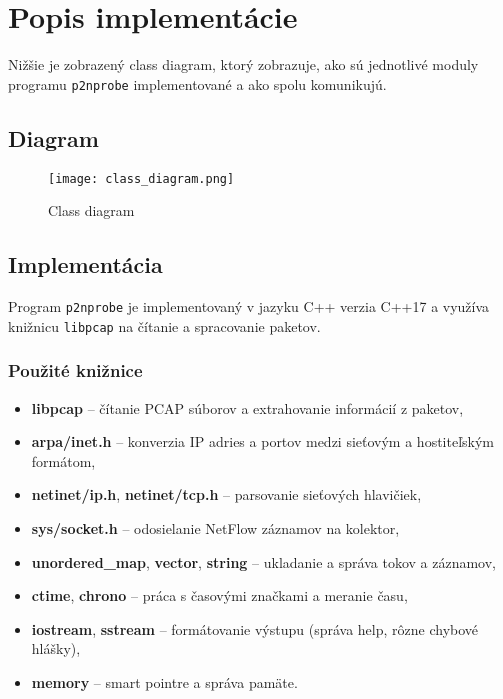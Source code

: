 \documentclass[a4paper, 12pt]{article}
\begin{document}
\section{Popis implementácie}

Nižšie je zobrazený class diagram, ktorý zobrazuje, ako sú jednotlivé moduly programu \texttt{p2nprobe} implementované a ako spolu komunikujú.

\newpage
\subsection{Diagram}

\begin{figure}[H]
    \centering
    \texttt{[image: class\_diagram.png]}
    \caption{Class diagram}
\end{figure}
\newpage

\subsection{Implementácia}

Program \texttt{p2nprobe} je implementovaný v jazyku C++ verzia C++17 a využíva knižnicu \texttt{libpcap} na čítanie a spracovanie paketov.

\subsubsection{Použité knižnice}

\begin{itemize}
    \item \textbf{libpcap} -- čítanie PCAP súborov a extrahovanie informácií z paketov,
    \item \textbf{arpa/inet.h} -- konverzia IP adries a portov medzi sieťovým a hostiteľským formátom,
    \item \textbf{netinet/ip.h}, \textbf{netinet/tcp.h} -- parsovanie sieťových hlavičiek,
    \item \textbf{sys/socket.h} -- odosielanie NetFlow záznamov na kolektor,
    \item \textbf{unordered\_map}, \textbf{vector}, \textbf{string} -- ukladanie a správa tokov a záznamov,
    \item \textbf{ctime}, \textbf{chrono} -- práca s časovými značkami a meranie času,
    \item \textbf{iostream}, \textbf{sstream} -- formátovanie výstupu (správa help, rôzne chybové hlášky),
    \item \textbf{memory} -- smart pointre a správa pamäte.
\end{itemize}
\end{document}
